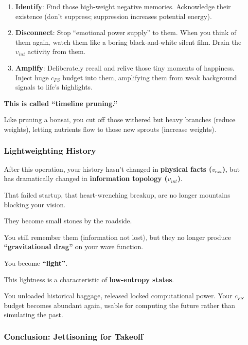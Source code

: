 \begin{enumerate}
\item \textbf{Identify}: Find those high-weight negative memories. Acknowledge their existence (don't suppress; suppression increases potential energy).

\item \textbf{Disconnect}: Stop ``emotional power supply'' to them. When you think of them again, watch them like a boring black-and-white silent film. Drain the $v_{int}$ activity from them.

\item \textbf{Amplify}: Deliberately recall and relive those tiny moments of happiness. Inject huge $c_{FS}$ budget into them, amplifying them from weak background signals to life's highlights.
\end{enumerate}

\textbf{This is called ``timeline pruning.''}

Like pruning a bonsai, you cut off those withered but heavy branches (reduce weights), letting nutrients flow to those new sprouts (increase weights).

\subsubsection{Lightweighting History}

After this operation, your history hasn't changed in \textbf{physical facts ($v_{ext}$)}, but has dramatically changed in \textbf{information topology ($v_{int}$)}.

That failed startup, that heart-wrenching breakup, are no longer mountains blocking your vision.

They become small stones by the roadside.

You still remember them (information not lost), but they no longer produce \textbf{``gravitational drag''} on your wave function.

You become \textbf{``light''}.

This lightness is a characteristic of \textbf{low-entropy states}.

You unloaded historical baggage, released locked computational power. Your $c_{FS}$ budget becomes abundant again, usable for computing the future rather than simulating the past.

\subsubsection{Conclusion: Jettisoning for Takeoff}


